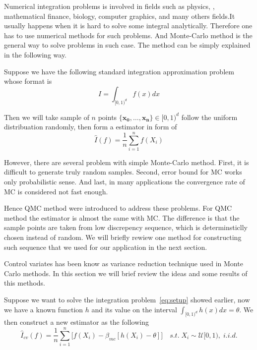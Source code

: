 
Numerical integration problems is involved in fields such as physics,
, mathematical finance, biology, computer graphics, and many others fields.It usually happens when it is hard to solve some integral analytically. Therefore one has to use numerical methods for such problems. 
And Monte-Carlo method is the general way to solve problems in such case\cite{fishman2013monte}. The method can be simply explained in the following way. 

Suppose we have the following standard integration approximation problem whose format is 
\begin{equation}
    \label{eq:setup}
    I= \int_{[0,1)^d}f(x)dx
\end{equation}

Then we will take sample of $n$ points $\{\mathbf{x_0},\dots, \mathbf{x_n}\}\in [0,1)^d$ follow the uniform distribuation randomly, then form a estimator in form of  
\[
\hat{I}(f)=\frac{1}{n}\sum_{i=1}^{n}f(X_i)
\]

However, there are several problem with simple Monte-Carlo method\cite{niederreiter2010quasi}.
First, it is difficult to generate truly random samples. Second, error bound for MC works only probabilistic sense. And last, in many applications the
convergence rate of MC is considered not fast enough. 

Hence QMC method were introduced to address these problems. For QMC method the estimator is almost the same with MC. The difference is that the sample points are taken from low discrepency sequence, which is determinsticlly chosen instead of random.   
We will briefly rewiew one method for constructing such sequence that we used for our application in the next section. 




Control variates has been know as variance reduction technique used in Monte Carlo methods. In this section we will brief review the ideas and some results of this methods.
 
Suppose we want to solve the integration problem~\eqref{eq:setup} showed earlier, now we have a known function $h$ and its value on the interval
$\int_{[0,1)^d} h(x)dx = \theta$.  We then construct a new estimator as the following 
\[ \hat{I}_{cv}(f)=\frac{1}{n}\sum_{i=1}^{n}\Big[ f(X_i)-\beta_{mc}[h(X_i)-\theta] \Big] \quad s.t.\; X_i\sim \mathcal{U}[0,1), \; i.i.d.\]

